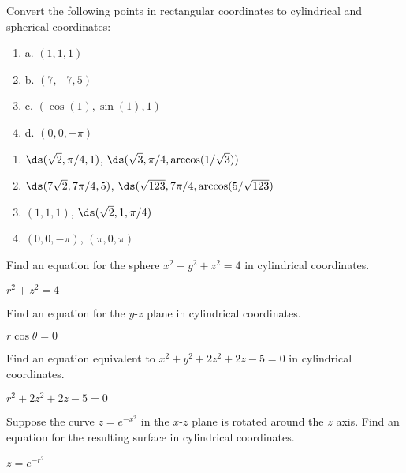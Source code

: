\begin{enumialphparenastyle}

\begin{ex}
Convert the following points in rectangular coordinates to
cylindrical and spherical coordinates:
\begin{enumerate}
\item{a.} $(1,1,1)$
\item{b.} $(7,-7,5)$
\item{c.} $(\cos(1),\sin(1),1)$
\item{d.} $(0,0,-\pi)$
\end{enumerate}
\begin{sol}
\begin{enumerate}
	\item	$\ds (\sqrt2,\pi/4,1)$, $\ds (\sqrt3,\pi/4,\arccos(1/\sqrt3))$
	\item	$\ds (7\sqrt2,7\pi/4,5)$, $\ds (\sqrt{123},7\pi/4,\arccos(5/\sqrt{123})$
	\item	$(1,1,1)$, $\ds (\sqrt2,1,\pi/4)$
	\item	$(0,0,-\pi)$, $(\pi,0,\pi)$
\end{enumerate}
\end{sol}
\end{ex}

\begin{ex}
Find an equation for the sphere $x^2+y^2+z^2=4$ in
cylindrical coordinates.
\begin{sol}
	$r^2+z^2=4$
\end{sol}
\end{ex}

\begin{ex}
Find an equation for the $y$-$z$ plane in cylindrical
coordinates. 
\begin{sol}
	$r\cos\theta=0$
\end{sol}
\end{ex}

\begin{ex}
Find an equation equivalent to $x^2+y^2+2z^2+2z-5=0$ in
cylindrical coordinates.
\begin{sol}
	$r^2+2z^2+2z-5=0$
\end{sol}
\end{ex}

\begin{ex}
Suppose the curve $z=e^{-x^2}$ in the $x$-$z$ plane is
rotated around the $z$ axis. Find an equation for the resulting
surface in cylindrical coordinates.
\begin{sol}
	$z=e^{-r^2}$
\end{sol}
\end{ex}


\end{enumialphparenastyle}
